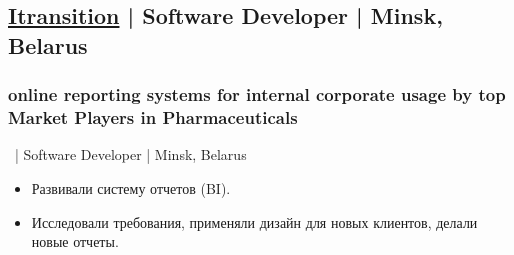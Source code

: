 \documentclass{article}
\begin{document}
\begin{minipage}[t]{0.6\textwidth}
    \subsection*{\href{http://www.itransition.com/}{Itransition} | Software Developer | Minsk, Belarus}
	\subsubsection*{online reporting systems for internal corporate usage by top Market Players in Pharmaceuticals}
    \ | Software Developer | Minsk, Belarus
    \begin{itemize}
      \item Развивали систему отчетов (BI). 
      \item Исследовали требования, применяли дизайн для новых клиентов, делали новые отчеты.
    \end{itemize}

  \end{minipage}
\end{document}
